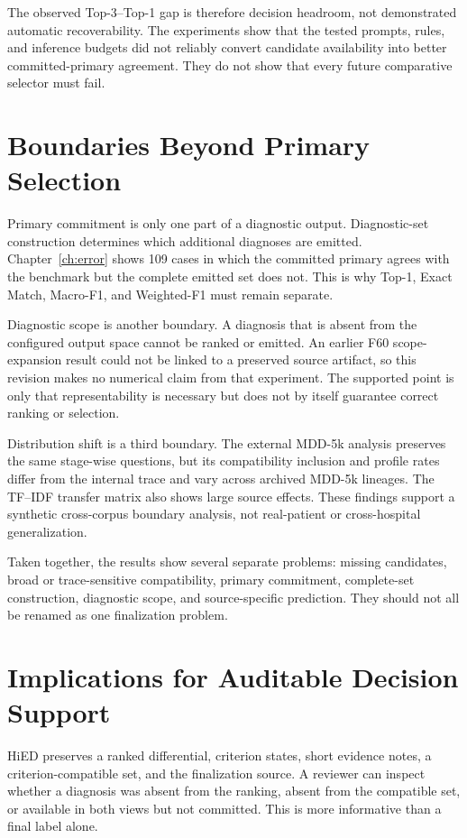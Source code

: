 The observed Top-3--Top-1 gap is therefore decision headroom, not demonstrated automatic recoverability. The experiments show that the tested prompts, rules, and inference budgets did not reliably convert candidate availability into better committed-primary agreement. They do not show that every future comparative selector must fail.

\section{Boundaries Beyond Primary Selection}
\label{sec:discussion-set-scope-transfer}

Primary commitment is only one part of a diagnostic output. Diagnostic-set construction determines which additional diagnoses are emitted. Chapter~\ref{ch:error} shows 109 cases in which the committed primary agrees with the benchmark but the complete emitted set does not. This is why Top-1, Exact Match, Macro-F1, and Weighted-F1 must remain separate.

Diagnostic scope is another boundary. A diagnosis that is absent from the configured output space cannot be ranked or emitted. An earlier F60 scope-expansion result could not be linked to a preserved source artifact, so this revision makes no numerical claim from that experiment. The supported point is only that representability is necessary but does not by itself guarantee correct ranking or selection.

Distribution shift is a third boundary. The external MDD-5k analysis preserves the same stage-wise questions, but its compatibility inclusion and profile rates differ from the internal trace and vary across archived MDD-5k lineages. The TF--IDF transfer matrix also shows large source effects. These findings support a synthetic cross-corpus boundary analysis, not real-patient or cross-hospital generalization.

Taken together, the results show several separate problems: missing candidates, broad or trace-sensitive compatibility, primary commitment, complete-set construction, diagnostic scope, and source-specific prediction. They should not all be renamed as one finalization problem.

\section{Implications for Auditable Decision Support}
\label{sec:discussion-clinical-implications}

HiED preserves a ranked differential, criterion states, short evidence notes, a criterion-compatible set, and the finalization source. A reviewer can inspect whether a diagnosis was absent from the ranking, absent from the compatible set, or available in both views but not committed. This is more informative than a final label alone.

